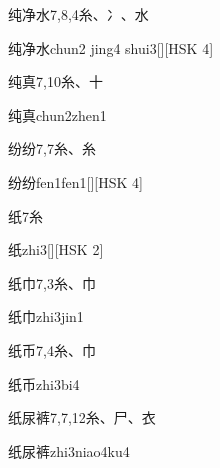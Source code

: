\begin{entry}{纯净水}{7,8,4}{⽷、⼎、⽔}
  \begin{phonetics}{纯净水}{chun2 jing4 shui3}[][HSK 4]
  \end{phonetics}
\end{entry}

\begin{entry}{纯真}{7,10}{⽷、⼗}
  \begin{phonetics}{纯真}{chun2zhen1}
  \end{phonetics}
\end{entry}

\begin{entry}{纷纷}{7,7}{⽷、⽷}
  \begin{phonetics}{纷纷}{fen1fen1}[][HSK 4]
  \end{phonetics}
\end{entry}

\begin{entry}{纸}{7}{⽷}
  \begin{phonetics}{纸}{zhi3}[][HSK 2]
  \end{phonetics}
\end{entry}

\begin{entry}{纸巾}{7,3}{⽷、⼱}
  \begin{phonetics}{纸巾}{zhi3jin1}
  \end{phonetics}
\end{entry}

\begin{entry}{纸币}{7,4}{⽷、⼱}
  \begin{phonetics}{纸币}{zhi3bi4}
  \end{phonetics}
\end{entry}

\begin{entry}{纸尿裤}{7,7,12}{⽷、⼫、⾐}
  \begin{phonetics}{纸尿裤}{zhi3niao4ku4}
  \end{phonetics}
\end{entry}

